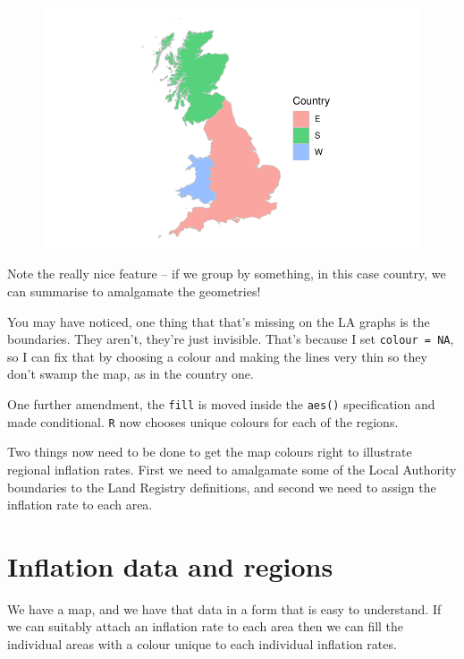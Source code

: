 \documentclass[
  letterpaper,
]{book}
\begin{document}
\begin{figure}[H]

{\centering \includegraphics{./Maps_files/figure-pdf/map0d-1.pdf}

}

\end{figure}

Note the really nice feature -- if we group by something, in this case
country, we can summarise to amalgamate the geometries!

You may have noticed, one thing that that's missing on the LA graphs is
the boundaries. They aren't, they're just invisible. That's because I
set \texttt{colour\ =\ NA}, so I can fix that by choosing a colour and
making the lines very thin so they don't swamp the map, as in the
country one.

One further amendment, the \texttt{fill} is moved inside the
\texttt{aes()} specification and made conditional. \texttt{R} now
chooses unique colours for each of the regions.

Two things now need to be done to get the map colours right to
illustrate regional inflation rates. First we need to amalgamate some of
the Local Authority boundaries to the Land Registry definitions, and
second we need to assign the inflation rate to each area.

\hypertarget{inflation-data-and-regions}{%
\section{Inflation data and regions}\label{inflation-data-and-regions}}

We have a map, and we have that data in a form that is easy to
understand. If we can suitably attach an inflation rate to each area
then we can fill the individual areas with a colour unique to each
individual inflation rates.
\end{document}
